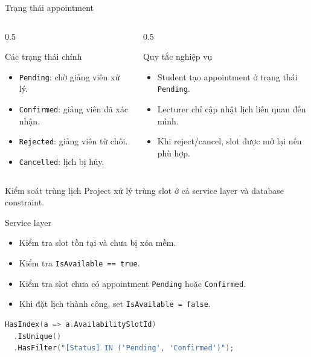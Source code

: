 \documentclass[aspectratio=169,11pt]{beamer}
\begin{document}
\begin{frame}{Trạng thái appointment}
  \begin{columns}[T]
    \begin{column}{0.5\textwidth}
      \begin{block}{Các trạng thái chính}
        \begin{itemize}
          \item \texttt{Pending}: chờ giảng viên xử lý.
          \item \texttt{Confirmed}: giảng viên đã xác nhận.
          \item \texttt{Rejected}: giảng viên từ chối.
          \item \texttt{Cancelled}: lịch bị hủy.
        \end{itemize}
      \end{block}
    \end{column}
    \begin{column}{0.5\textwidth}
      \begin{block}{Quy tắc nghiệp vụ}
        \begin{itemize}
          \item Student tạo appointment ở trạng thái \texttt{Pending}.
          \item Lecturer chỉ cập nhật lịch liên quan đến mình.
          \item Khi reject/cancel, slot được mở lại nếu phù hợp.
        \end{itemize}
      \end{block}
    \end{column}
  \end{columns}
\end{frame}

\begin{frame}[fragile]{Kiểm soát trùng lịch}
  Project xử lý trùng slot ở cả service layer và database constraint.

  \begin{block}{Service layer}
    \begin{itemize}
      \item Kiểm tra slot tồn tại và chưa bị xóa mềm.
      \item Kiểm tra \texttt{IsAvailable == true}.
      \item Kiểm tra slot chưa có appointment \texttt{Pending} hoặc \texttt{Confirmed}.
      \item Khi đặt lịch thành công, set \texttt{IsAvailable = false}.
    \end{itemize}
  \end{block}

  \begin{lstlisting}[language=C]
HasIndex(a => a.AvailabilitySlotId)
  .IsUnique()
  .HasFilter("[Status] IN ('Pending', 'Confirmed')");
  \end{lstlisting}
\end{frame}
\end{document}
